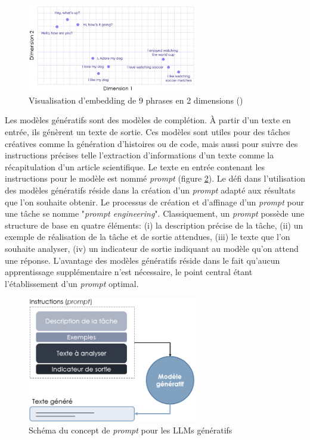 \begin{figure}[!ht]
 \centering
 \includegraphics[width=0.66\textwidth]{figures/sentence_embed.png}
 \caption[Visualisation d'embedding de 9 phrases en 2 dimensions]{Visualisation d'embedding de 9 phrases en 2 dimensions (\cite{luis_serrano_what_2023})}
 \label{fig:sentence_embed}
\end{figure}


Les modèles génératifs sont des modèles de complétion. À partir d'un texte en entrée, ils génèrent un texte de sortie. Ces modèles sont utiles pour des tâches créatives comme la génération d'histoires ou de code, mais aussi pour suivre des instructions précises telle l'extraction d'informations d'un texte comme la récapitulation d'un article scientifique. Le texte en entrée contenant les instructions pour le modèle est nommé \textit{prompt} (figure \ref{fig:llm-prompt}). Le défi dans l'utilisation des modèles génératifs réside dans la création d'un \textit{prompt} adapté aux résultats que l'on souhaite obtenir. Le processus de création et d'affinage d'un \textit{prompt} pour une tâche se nomme "\textit{prompt engineering}". Classiquement, un \textit{prompt} possède une structure de base en quatre éléments: (i) la description précise de la tâche, (ii) un exemple de réalisation de la tâche et de sortie attendues, (iii) le texte que l'on souhaite analyser, (iv) un indicateur de sortie indiquant au modèle qu'on attend une réponse. L'avantage des modèles génératifs réside dans le fait qu'aucun apprentissage supplémentaire n'est nécessaire, le point central étant l'établissement d'un \textit{prompt} optimal.

\begin{figure}[!ht]
 \centering
 \includegraphics[width=0.66\textwidth]{figures/promt_llm.png}
 \caption[Schéma du concept de \textit{prompt} pour les LLMs génératifs]{Schéma du concept de \textit{prompt} pour les LLMs génératifs}
 \label{fig:llm-prompt}
\end{figure}

